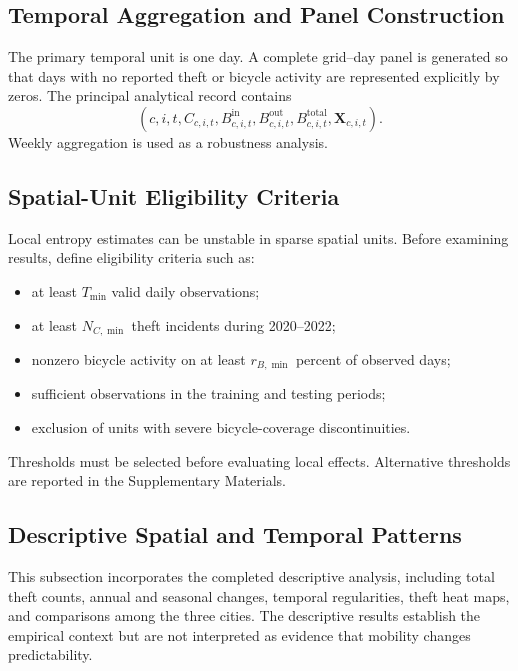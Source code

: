 \documentclass[applsci,article,submit,moreauthors]{Definitions/mdpi}
\begin{document}

\subsection{Temporal Aggregation and Panel Construction}
\label{subsec:temporal_aggregation}

The primary temporal unit is one day. A complete grid--day panel is generated so that days with no reported theft or bicycle activity are represented explicitly by zeros. The principal analytical record contains
\begin{equation}
\left(c,i,t,C_{c,i,t},B^{\mathrm{in}}_{c,i,t},B^{\mathrm{out}}_{c,i,t},B^{\mathrm{total}}_{c,i,t},\mathbf{X}_{c,i,t}\right).
\end{equation}
Weekly aggregation is used as a robustness analysis.

\subsection{Spatial-Unit Eligibility Criteria}
\label{subsec:eligibility}

Local entropy estimates can be unstable in sparse spatial units. Before examining results, define eligibility criteria such as:
\begin{itemize}
    \item at least $T_{\min}$ valid daily observations;
    \item at least $N_{C,\min}$ theft incidents during 2020--2022;
    \item nonzero bicycle activity on at least $r_{B,\min}$ percent of observed days;
    \item sufficient observations in the training and testing periods;
    \item exclusion of units with severe bicycle-coverage discontinuities.
\end{itemize}
Thresholds must be selected before evaluating local effects. Alternative thresholds are reported in the Supplementary Materials.

\subsection{Descriptive Spatial and Temporal Patterns}
\label{subsec:descriptive_patterns}

This subsection incorporates the completed descriptive analysis, including total theft counts, annual and seasonal changes, temporal regularities, theft heat maps, and comparisons among the three cities. The descriptive results establish the empirical context but are not interpreted as evidence that mobility changes predictability.
\end{document}
